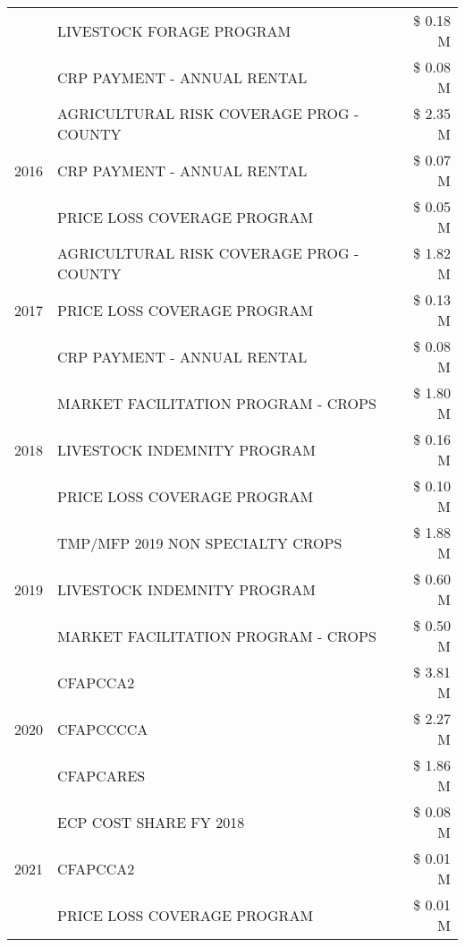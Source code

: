 \begin{tabular}{llr}
 & LIVESTOCK FORAGE PROGRAM & \$ 0.18 M \\
 & CRP PAYMENT - ANNUAL RENTAL & \$ 0.08 M \\
\cline{1-3}
\multirow[t]{3}{*}{2016} & AGRICULTURAL RISK COVERAGE PROG - COUNTY & \$ 2.35 M \\
 & CRP PAYMENT - ANNUAL RENTAL & \$ 0.07 M \\
 & PRICE LOSS COVERAGE PROGRAM & \$ 0.05 M \\
\cline{1-3}
\multirow[t]{3}{*}{2017} & AGRICULTURAL RISK COVERAGE PROG - COUNTY & \$ 1.82 M \\
 & PRICE LOSS COVERAGE PROGRAM & \$ 0.13 M \\
 & CRP PAYMENT - ANNUAL RENTAL & \$ 0.08 M \\
\cline{1-3}
\multirow[t]{3}{*}{2018} & MARKET FACILITATION PROGRAM - CROPS & \$ 1.80 M \\
 & LIVESTOCK INDEMNITY PROGRAM & \$ 0.16 M \\
 & PRICE LOSS COVERAGE PROGRAM & \$ 0.10 M \\
\cline{1-3}
\multirow[t]{3}{*}{2019} & TMP/MFP 2019 NON SPECIALTY CROPS & \$ 1.88 M \\
 & LIVESTOCK INDEMNITY PROGRAM & \$ 0.60 M \\
 & MARKET FACILITATION PROGRAM - CROPS & \$ 0.50 M \\
\cline{1-3}
\multirow[t]{3}{*}{2020} & CFAPCCA2 & \$ 3.81 M \\
 & CFAPCCCCA & \$ 2.27 M \\
 & CFAPCARES & \$ 1.86 M \\
\cline{1-3}
\multirow[t]{3}{*}{2021} & ECP COST SHARE FY 2018 & \$ 0.08 M \\
 & CFAPCCA2 & \$ 0.01 M \\
 & PRICE LOSS COVERAGE PROGRAM & \$ 0.01 M \\
\cline{1-3}
\bottomrule
\end{tabular}
